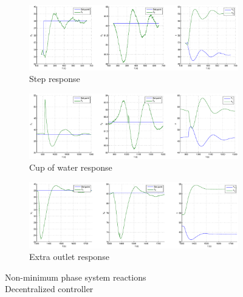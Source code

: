 \begin{figure}[h!t]
        \centering
        \begin{subfigure}[b]{\columnwidth}
                \includegraphics[width=\columnwidth]{fig/nonmin_dyn_step.eps}
                \caption{Step response}
        \end{subfigure}
        \begin{subfigure}[b]{\columnwidth}
                \includegraphics[width=\columnwidth]{fig/nonmin_dyn_gob.eps}
                \caption{Cup of water response}
        \end{subfigure}
        \begin{subfigure}[b]{\columnwidth}
                \includegraphics[width=\columnwidth]{fig/nonmin_dyn_fui.eps}
                \caption{Extra outlet response}
        \end{subfigure}
        \caption{Non-minimum phase system reactions \\ Decentralized controller}
        \label{nonmin_dyn_fig}
\end{figure}
